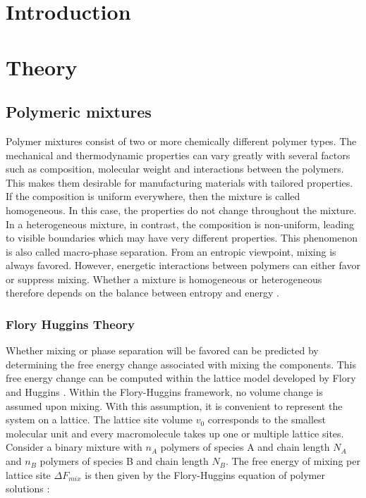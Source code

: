 \documentclass[bachelor,       %
               twoside,        %
               BCOR10mm,       %
                ngerman,english  %
               ]{GAUBM}
\begin{document}
\mainmatter   %

\chapter{Introduction}


\chapter{Theory}

\section{Polymeric mixtures}

Polymer mixtures consist of two or more chemically different polymer types. The mechanical and thermodynamic properties can vary greatly with several factors such as composition, molecular weight and interactions between the polymers. This makes them desirable for manufacturing materials with tailored properties.\\
If the composition is uniform everywhere, then the mixture is called homogeneous. In this case, the properties do not change throughout the mixture. In a heterogeneous mixture, in contrast, the composition is non-uniform, leading to visible boundaries which may have very different properties. This phenomenon is also called macro-phase separation. From an entropic viewpoint, mixing is always favored. However, energetic interactions between polymers can either favor or suppress mixing. Whether a mixture is homogeneous or heterogeneous therefore depends on the balance between entropy and energy \cite[S. 137]{Rubin03}.           

\subsection{Flory Huggins Theory}

Whether mixing or phase separation will be favored can be predicted by determining the free energy change associated with mixing the components. This free energy change can be computed within the lattice model developed by Flory and Huggins \cite{Flory42}. Within the Flory-Huggins framework, no volume change is assumed upon mixing. With this assumption, it is convenient to represent the system on a lattice. The lattice site volume $v_0$ corresponds to the smallest molecular unit and every macromolecule takes up one or multiple lattice sites. Consider a binary mixture with $n_A$ polymers of species A and chain length $N_A$ and $n_B$ polymers of species B and chain length $N_B$. The free energy of mixing per lattice site $\Delta F_{mix}$ is then given by the Flory-Huggins equation of polymer solutions \cite[S. 143]{Rubin03}:
\end{document}
